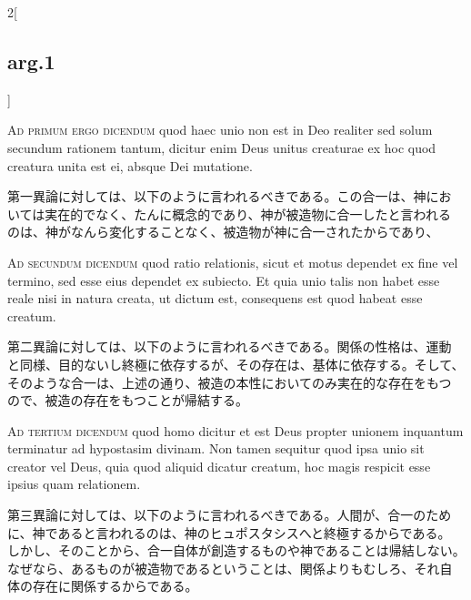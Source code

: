 \documentclass[paper=a4paper,fontsize=10pt,jafontsize=9pt,titlepage]{jlreq}
\begin{document}
\begin{paracol}{2}[\subsection{arg.1}]
\switchcolumn*[\subsection{ad.1}]

{\scshape Ad primum ergo dicendum} quod haec unio non est in Deo
realiter sed solum secundum rationem tantum, dicitur enim Deus unitus
creaturae ex hoc quod creatura unita est ei, absque Dei mutatione.

\switchcolumn

第一異論に対しては、以下のように言われるべきである。この合一は、神にお
いては実在的でなく、たんに概念的であり、神が被造物に合一したと言われる
のは、神がなんら変化することなく、被造物が神に合一されたからであり、

\switchcolumn*[\subsection{ad.2}]

{\scshape Ad secundum dicendum} quod ratio relationis, sicut et motus
dependet ex fine vel termino, sed esse eius dependet ex subiecto. Et
quia unio talis non habet esse reale nisi in natura creata, ut dictum
est, consequens est quod habeat esse creatum.

\switchcolumn

第二異論に対しては、以下のように言われるべきである。関係の性格は、運動
と同様、目的ないし終極に依存するが、その存在は、基体に依存する。そして、
そのような合一は、上述の通り、被造の本性においてのみ実在的な存在をもつ
ので、被造の存在をもつことが帰結する。

\switchcolumn*[\subsection{ad.3}]

{\scshape Ad tertium dicendum} quod homo dicitur et est Deus propter
unionem inquantum terminatur ad hypostasim divinam. Non tamen sequitur
quod ipsa unio sit creator vel Deus, quia quod aliquid dicatur
creatum, hoc magis respicit esse ipsius quam relationem.

\switchcolumn

第三異論に対しては、以下のように言われるべきである。人間が、合一のため
に、神であると言われるのは、神のヒュポスタシスへと終極するからである。
しかし、そのことから、合一自体が創造するものや神であることは帰結しない。
なぜなら、あるものが被造物であるということは、関係よりもむしろ、それ自
体の存在に関係するからである。

\end{paracol}
\newpage
\end{document}
